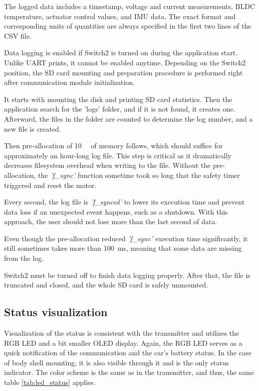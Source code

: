 The logged data includes a timestamp, voltage and current measurements, BLDC temperature, actuator control values, and IMU data. The exact format and corresponding units of quantities are always specified in the first two lines of the CSV file.

Data logging is enabled if Switch2 is turned on during the application start. Unlike UART prints, it cannot be enabled anytime. Depending on the Switch2 position, the SD card mounting and preparation procedure is performed right after communication module initialization.

It starts with mounting the disk and printing SD card statistics. Then the application search for the 'logs' folder, and if it is not found, it creates one. Afterward, the files in the folder are counted to determine the log number, and a new file is created.

Then pre-allocation of \SI{10}{\mebi\byte} of memory follows, which should suffice for approximately an \mbox{hour-long} log file. This step is critical as it dramatically decreases filesystem overhead when writing to the file. Without the pre-allocation, the \textit{'f\_sync'} function sometime took so long that the safety timer triggered and reset the motor.

Every second, the log file is \textit{'f\_synced'} to lower its execution time and prevent data loss if an unexpected event happens, such as a shutdown. With this approach, the user should not lose more than the last second of data.

Even though the pre-allocation reduced \textit{'f\_sync'} execution time significantly, it still sometimes takes more than \SI{100}{\ms}, meaning that some data are missing from the log.

Switch2 must be turned off to finish data logging properly. After that, the file is truncated and closed, and the whole SD card is safely unmounted.

\subsection{Status visualization}
Visualization of the status is consistent with the transmitter and utilizes the RGB LED and a bit smaller OLED display. Again, the RGB LED serves as a quick notification of the communication and the car's battery status. In the case of body shell mounting, it is also visible through it and is the only status indicator. The color scheme is the same as in the transmitter, and thus, the same table \ref{tab:led_status} applies.

